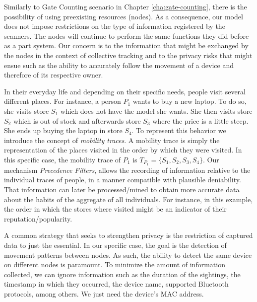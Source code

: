 Similarly to Gate Counting scenario in Chapter
\ref{cha:gate-counting}, there is the possibility of using preexisting
resources (nodes). As a consequence, our model does not impose
restrictions on the type of information registered by the
scanners. The nodes will continue to perform the same functions they
did before as a part system. Our concern is to the information that
might be exchanged by the nodes in the context of collective tracking
and to the privacy risks that might ensue such as the ability
to accurately follow the movement of a device and therefore of its
respective owner.

In their everyday life and depending on their specific needs, people
visit several different places. For instance, a person $P_1$ wants to
buy a new laptop. To do so, she visits store $S_1$ which does not have
the model she wants. She then visits store $S_2$ which is out of
stock and afterwards store $S_3$ where the price is a little
steep. She ends up buying the laptop in store $S_4$. To represent this
behavior we introduce the concept of \emph{mobility traces}. A
mobility trace is simply the representation of the places visited in the
order by which they were visited. In this specific case, the mobility
trace of $P_1$ is $T_{P_1}=\{S_1,S_2,S_3,S_4\}$. Our mechanism
\emph{Precedence Filters}, allows the recording of information
relative to the individual traces of people, in a manner compatible
with plausible deniability. That information can later be
processed/mined to obtain more accurate data about the habits of the
aggregate of all individuals. For instance, in this example, the order
in which the stores where visited might be an indicator of their
reputation/popularity.

A common strategy that seeks to strengthen privacy is the restriction
of captured data to just the essential. In our specific case, the goal
is the detection of movement patterns between nodes. As such, the
ability to detect the same device on different nodes is paramount. To
minimize the amount of information collected, we can ignore
information such as the duration of the sightings, the timestamp in which
they occurred, the device name, supported Bluetooth protocols,
among others. We just need the device's MAC address.

